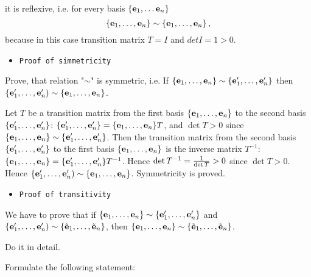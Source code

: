 \documentclass[12pt]{article}
\numberwithin{equation}{section}
\begin{document}
 
  it is reflexive, i.e. for every basis $\{{\bf e}_1,\dots{\bf e}_n\}$
   \begin{equation}\label{reflex}
     \{{\bf e}_1,\dots,{\bf e}_n\}\sim \{{\bf e}_1,\dots,{\bf e}_n\}\,,
\end{equation}
     because in this case transition 
matrix $T=I$ and $det I=1>0$.

  \begin{itemize}
   \item {\tt Proof of simmetricity}
     \end {itemize}

Prove, that relation "$\sim$" is  symmetric, i.e.
If  $\{{\bf e}_1,\dots,{\bf e}_n\}\sim \{{\bf e}'_1,\dots,{\bf e}'_n\}$ 
then $\{{\bf e}'_1,\dots,{\bf e}'_n)\sim \{{\bf e}_1,\dots,{\bf e}_n\}$.


Let $T$ be a  transition matrix from the 
first basis $\{{\bf e}_1,\dots,{\bf e}_n\}$ to the second
basis $\{{\bf e}'_1,\dots,{\bf e}'_n\}$: $\{{\bf e}'_1,\dots,{\bf e}'_n\}=
\{{\bf e}_1,\dots,{\bf e}_n\}T$, and $\det T>0$ since
 $\{{\bf e}_1,\dots,{\bf e}_n\}\sim \{{\bf e}'_1,\dots,{\bf e}'_n\}$. 
Then the transition matrix from the 
second basis $\{{\bf e}'_1,\dots,{\bf e}'_n\}$
 to the first basis $\{{\bf e}_1,\dots,{\bf e}_n\}$ 
is the inverse matrix $T^{-1}$:
    $\{{\bf e}_1,\dots,{\bf e}_n\}=\{{\bf e}'_1,\dots,{\bf e}'_n\}T^{-1}$.
    Hence $\det T^{-1}={1\over \det T}>0$ since $\det T>0$.
Hence $\{{\bf e}'_1,\dots,{\bf e}'_n)\sim \{{\bf e}_1,\dots,{\bf e}_n\}$.
Symmetricity is proved.


  \begin{itemize}
   \item {\tt Proof of transitivity}
     \end {itemize}



We have to prove that if 
$\{{\bf e}_1,\dots,{\bf e}_n\}\sim \{{\bf e}'_1,\dots,{\bf e}'_n\}$ 
and 
$\{{\bf e}'_1,\dots,{\bf e}'_n)\sim\{\tilde {{\bf e}}_1,\dots, \tilde{{\bf e}}_n\}$, 
then 
$\{{\bf e}_1,\dots,{\bf e}_n\}\sim \{\tilde {{\bf e}}_1,\dots, \tilde{{\bf e}}_n\}$.  

  Do it in detail.

Formulate the following statement:

\smallskip
\end{document}
